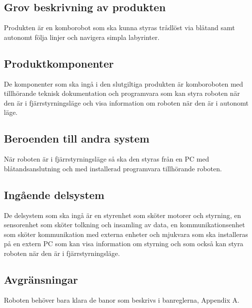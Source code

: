 \documentclass[a4paper,12pt]{article}
\begin{document}
\subsection{Grov beskrivning av produkten}
Produkten är en komborobot som ska kunna styras trådlöst via blåtand samt autonomt följa linjer och navigera simpla labyrinter.


\subsection{Produktkomponenter}
De komponenter som ska ingå i den slutgiltiga produkten är
komboroboten med tillhörande teknisk dokumentation och programvara som 
kan styra roboten när den är i fjärrstyrningsläge och visa information om roboten när den är i autonomt läge.

\subsection{Beroenden till andra system}
När roboten är i fjärrstyrningsläge så ska den styras från en PC 
med blåtandsanslutning och med installerad programvara tillhörande roboten.

\subsection{Ingående delsystem}
De delsystem som ska ingå är en styrenhet som sköter motorer och styrning,
en sensorenhet som sköter tolkning och insamling av data,
en kommunikationsenhet som sköter kommunikation med externa enheter och mjukvara 
som ska installeras på en extern PC som kan visa information om 
styrning och som också kan styra roboten när den är i fjärrstyrningsläge.




\subsection{Avgränsningar}
Roboten behöver bara klara de banor som beskrivs i banreglerna, Appendix A.
\end{document}
